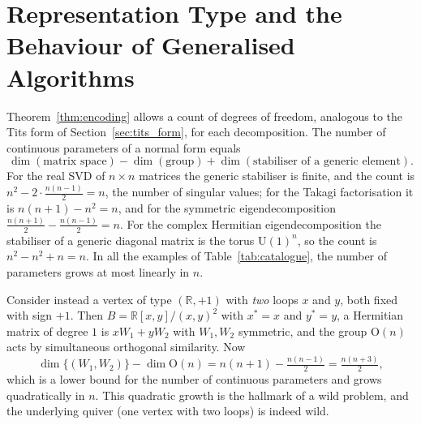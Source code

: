 \documentclass[12pt, a4paper]{report}
\theoremstyle{plain}
\theoremstyle{definition}
\theoremstyle{remark}
\theoremstyle{plain}
\newcommand{\RR}{\mathbb{R}}
\newcommand{\Or}{\mathrm{O}}
\newcommand{\Un}{\mathrm{U}}
\begin{document}
\section{Representation Type and the Behaviour of Generalised Algorithms}
\label{sec:wild-behaviour}
Theorem~\ref{thm:encoding} allows a count of degrees of freedom, analogous to the Tits form of Section~\ref{sec:tits_form}, for each decomposition. The number of continuous parameters of a normal form equals
\[ \dim(\text{matrix space})-\dim(\text{group})+\dim(\text{stabiliser of a generic element}). \]
For the real SVD of $n\times n$ matrices the generic stabiliser is finite, and the count is $n^2-2\cdot\tfrac{n(n-1)}{2}=n$, the number of singular values; for the Takagi factorisation it is $n(n+1)-n^2=n$, and for the symmetric eigendecomposition $\tfrac{n(n+1)}{2}-\tfrac{n(n-1)}{2}=n$. For the complex Hermitian eigendecomposition the stabiliser of a generic diagonal matrix is the torus $\Un(1)^n$, so the count is $n^2-n^2+n=n$. In all the examples of Table~\ref{tab:catalogue}, the number of parameters grows at most linearly in $n$.

Consider instead a vertex of type $(\RR,+1)$ with \emph{two} loops $x$ and $y$, both fixed with sign $+1$. Then $B=\RR[x,y]/(x,y)^2$ with $x^*=x$ and $y^*=y$, a Hermitian matrix of degree $1$ is $xW_1+yW_2$ with $W_1,W_2$ symmetric, and the group $\Or(n)$ acts by simultaneous orthogonal similarity. Now
\[ \dim\{(W_1,W_2)\}-\dim\Or(n)=n(n+1)-\tfrac{n(n-1)}{2}=\tfrac{n(n+3)}{2}, \]
which is a lower bound for the number of continuous parameters and grows quadratically in $n$. This quadratic growth is the hallmark of a wild problem, and the underlying quiver (one vertex with two loops) is indeed wild.
\end{document}
